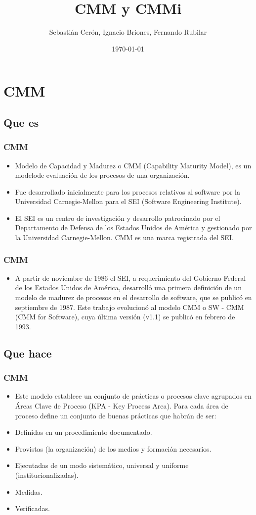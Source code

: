 \documentclass{beamer}
\title{CMM y CMMi}
\author{Sebastián Cerón, Ignacio Briones, Fernando Rubilar}
\date{\today}
\begin{document}
\frame{\titlepage}

\section[Índice]{}
\frame{\tableofcontents}
\section{CMM}
\subsection{Que es}

\frame
{
  \frametitle{CMM}
  \begin{itemize}
    \item<1-> Modelo de Capacidad y Madurez o CMM (Capability Maturity Model), es un modelode evaluación de los procesos de una organización. 
    \item<2-> Fue desarrollado inicialmente para los procesos relativos al software por la Universidad Carnegie-Mellon para el SEI (Software Engineering Institute).
    \item<3-> El SEI es un centro de investigación y desarrollo patrocinado por el Departamento de Defensa de los Estados Unidos de América y gestionado por la Universidad Carnegie-Mellon. CMM es una marca registrada del SEI.
  \end{itemize}
}

\frame
{
  \frametitle{CMM}
  \begin{itemize}
    \item<1-> A partir de noviembre de 1986 el SEI, a requerimiento del Gobierno Federal de los Estados Unidos de América, desarrolló una primera definición de un modelo de madurez de procesos en el desarrollo de software, que se publicó en septiembre de 1987. Este trabajo evolucionó al modelo CMM o SW - CMM (CMM for Software), cuya última versión (v1.1) se publicó en febrero de 1993.
  \end{itemize}
}

\subsection{Que hace}

\frame
{
  \frametitle{CMM}
  \begin{itemize}
    \item<1-> Este modelo establece un conjunto de prácticas o procesos clave agrupados en Áreas Clave de Proceso (KPA - Key Process Area). Para cada área de proceso define un conjunto de buenas prácticas que habrán de ser:
    \item<2-> Definidas en un procedimiento documentado.
    \item<3-> Provistas (la organización) de los medios y formación necesarios.
    \item<4-> Ejecutadas de un modo sistemático, universal y uniforme (institucionalizadas).
    \item<5-> Medidas.
    \item<6-> Verificadas.
  \end{itemize}
}
\end{document}
